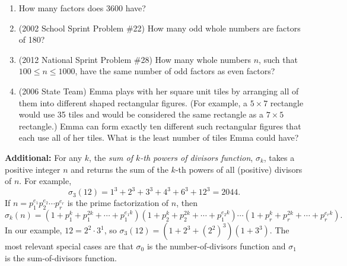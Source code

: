 \documentclass{article}
\begin{document}
\begin{enumerate}
\item How many factors does 3600 have?\vspace{2cm}
\item (2002 School Sprint Problem \#22) How many odd whole numbers are factors of 180?\vspace{2cm}
\item (2012 National Sprint Problem \#28) How many whole numbers $n$, such that $100\leq n\leq 1000$, have the same number of odd factors as even factors?\vspace{2cm}
\item (2006 State Team) Emma plays with her square unit tiles by arranging all of them into different shaped rectangular figures. (For example, a $5\times 7$ rectangle would use 35 tiles and would be considered the same rectangle as a $7\times 5$ rectangle.) Emma can form exactly ten different such rectangular figures that each use all of her tiles. What is the least number of tiles Emma could have?\vspace{2cm}
\end{enumerate}
\textbf{Additional:} For any $k$, the \emph{sum of $k$-th powers of divisors function}, $\sigma_k$, takes a positive integer $n$ and returns the sum of the $k$-th powers of all (positive) divisors of $n$. For example,
\begin{equation*}
\sigma_3(12) = 1^3 + 2^3 + 3^3 + 4^3 + 6^3 + 12^3 = 2044.
\end{equation*}
If $n = p_1^{e_1}p_2^{e_2}\cdots p_r^{e_r}$ is the prime factorization of $n$, then
\begin{equation*}
\boxed{\sigma_k(n) = (1 + p_1^k + p_1^{2k} + \cdots + p_1^{e_1k})(1 + p_2^k + p_2^{2k} + \cdots + p_1^{e_2k})\cdots (1 + p_r^k + p_r^{2k} + \cdots + p_r^{e_rk}).}
\end{equation*}
In our example, $12 = 2^2\cdot 3^1$, so $\sigma_3(12) = (1 + 2^3 + (2^2)^3)(1 + 3^3)$. The most relevant special cases are that $\sigma_0$ is the number-of-divisors function and $\sigma_1$ is the sum-of-divisors function.


\newpage
\end{document}
